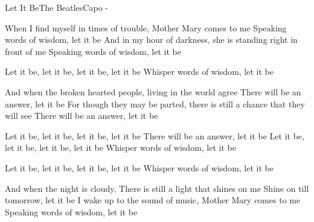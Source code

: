 \begin{song}{Let It Be}{The Beatles}{Capo -}


When I find myself in times of trouble, Mother Mary comes to me
Speaking words of wisdom, let it be
And in my hour of darkness, she is standing right in front of me
Speaking words of wisdom, let it be

Let it be, let it be, let it be, let it be
Whisper words of wisdom, let it be

And when the broken hearted people, living in the world agree
There will be an answer, let it be
For though they may be parted, there is still a chance that they will see
There will be an answer, let it be

Let it be, let it be, let it be, let it be
There will be an answer, let it be
Let it be, let it be, let it be, let it be
Whisper words of wisdom, let it be



Let it be, let it be, let it be, let it be
Whisper words of wisdom, let it be

And when the night is cloudy,
There is still a light that shines on me
Shine on till tomorrow, let it be
I wake up to the sound of music, Mother Mary comes to me
Speaking words of wisdom, let it be


\end{song}
